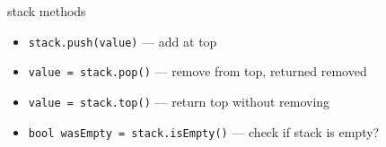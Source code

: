 \begin{frame}[fragile,label=stackOps]{stack methods}
\lstset{
    language=C++,
    style=small
}
\begin{itemize}
\item \lstinline|stack.push(value)| --- add at top
\item \lstinline|value = stack.pop()| --- remove from top, returned removed
\item \lstinline|value = stack.top()| --- return top without removing
\item \lstinline|bool wasEmpty = stack.isEmpty()| --- check if stack is empty?
\end{itemize}
\end{frame}
